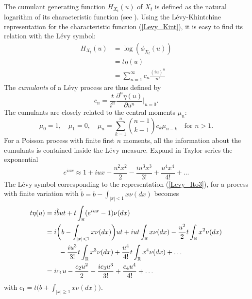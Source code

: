 The cumulant generating function $H_{X_t}(u)$ of $X_t$ is defined as the natural logarithm of its characteristic function
(see \cite{Cont}). 
Using the Lévy-Khintchine representation for the characteristic function (\ref{Levy_Kint}), it is easy to find its relation with
the Lévy symbol:
\begin{align}
H_{X_t}(u) &= \log(\phi_{X_t}(u)) \\ \nonumber
           &= t \eta(u) \\ \nonumber
           &= \sum_{n=1}^{\infty} c_n \frac{(iu)^n}{n!}
\end{align}
The \emph{cumulants} of a Lévy process are thus defined by
\begin{equation}\label{cumulants}
 c_n = \frac{t}{i^n} \frac{\partial^n \eta(u) }{\partial u^{n}} \biggr|_{u=0} .
\end{equation}
The cumulants are closely related to the central moments $\mu_n$: 
\begin{equation}\label{moment_cumulants}
 \mu_0 = 1,\hspace{1em} \mu_1=0, \hspace{1em} \mu_n=\sum_{k=1}^n \binom{n-1}{k-1}  c_k \mu_{n-k} \hspace{1em} \mbox{for } n>1.  
\end{equation}
For a Poisson process with finite first $n$ moments, all the information about the cumulants is contained inside the Lévy measure.
Expand in Taylor series the exponential 
$$ e^{iux} \approx 1 +iux - \frac{u^2x^2}{2} -\frac{iu^3x^3}{3!} +\frac{u^4x^4}{4!} + \dots $$ 
The Lévy symbol corresponding to the representation (\ref{Levy_Ito3}), for a process
with finite variation with $\tilde b = b - \int_{|x|<1} x \nu(dx)$
becomes
\begin{align}\label{cumulant_expansion}
 t \eta(u) &= i\tilde b u t + t \int_{\mathbb{R}} (e^{iux} -1) \nu(dx) \\ \nonumber
          &= i\biggl( b-\int_{|x|<1} x \nu(dx) \biggr)ut +iu t\int_{\mathbb{R}} x \nu(dx) - \frac{u^2}{2}t\int_{\mathbb{R}}x^2 \nu(dx) \\ \nonumber 
          & \hspace{2em} -\frac{iu^3}{3!}t\int_{\mathbb{R}} x^3 \nu(dx) +\frac{u^4}{4!}t\int_{\mathbb{R}} x^4 \nu(dx) + \dots\\ \nonumber
	  &= ic_1 u -\frac{c_2u^2}{2} -\frac{ic_3u^3}{3!} + \frac{c_4u^4}{4!} + \dots 
\end{align}
with $c_1= t \bigl( b+\int_{|x|\geq 1} x \nu(dx) \bigr)$.




